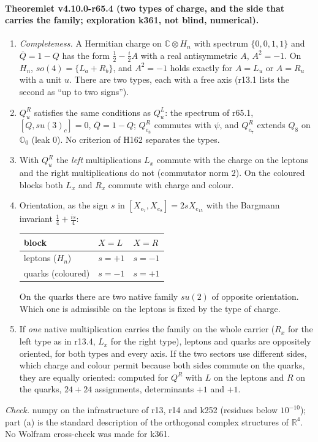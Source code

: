 \paragraph{Theoremlet v4.10.0-r65.4 (two types of charge, and the side that carries the family; exploration k361, not blind, numerical).}
\begin{enumerate}[leftmargin=2em]
\item[(a)] \emph{Completeness.}  A Hermitian charge on \(\mathbb C\otimes H_n\) with spectrum \(\{0,0,1,1\}\) and \(\overline Q=1-Q\) has the form
\(\tfrac12-\tfrac i2A\) with a real antisymmetric \(A\), \(A^2=-1\).  On \(H_n\), \(so(4)=\{L_a+R_b\}\), and \(A^2=-1\) holds exactly for
\(A=L_u\) or \(A=R_u\) with a unit \(u\).  There are two types, each with a free axis (r13.1 lists the second as ``up to two signs'').
\item[(b)] \(Q^R_u\) satisfies the same conditions as \(Q^L_u\): the spectrum of r65.1, \([Q,su(3)_c]=0\), \(\overline Q=1-Q\); \(Q^R_{e_8}\)
commutes with \(\psi\), and \(Q^R_{e_7}\) extends \(Q_8\) on \(\mathbb O_0\) (leak \(0\)).  No criterion of H162 separates the types.
\item[(c)] With \(Q^R_u\) the \emph{left} multiplications \(L_x\) commute with the charge on the leptons and the right multiplications do not
(commutator norm \(2\)).  On the coloured blocks both \(L_x\) and \(R_x\) commute with charge and colour.
\item[(d)] Orientation, as the sign \(s\) in \([X_{e_7},X_{e_8}]=2sX_{e_{15}}\) with the Bargmann invariant \(\tfrac14+\tfrac{is}4\):
\begin{center}
\small
\begin{tabular}{@{}lll@{}}
\toprule
block & \(X=L\) & \(X=R\)\\
\midrule
leptons (\(H_n\)) & \(s=+1\) & \(s=-1\)\\
quarks (coloured) & \(s=-1\) & \(s=+1\)\\
\bottomrule
\end{tabular}
\end{center}
On the quarks there are two native family \(su(2)\) of opposite orientation.  Which one is admissible on the leptons is fixed by the type of charge.
\item[(e)] If \emph{one} native multiplication carries the family on the whole carrier (\(R_x\) for the left type as in r13.4, \(L_x\) for the right
type), leptons and quarks are oppositely oriented, for both types and every axis.  If the two sectors use different sides, which charge and colour
permit because both sides commute on the quarks, they are equally oriented: computed for \(Q^R\) with \(L\) on the leptons and \(R\) on the
quarks, \(24+24\) assignments, determinants \(+1\) and \(+1\).
\end{enumerate}
\emph{Check.} numpy on the infrastructure of r13, r14 and k252 (residues below \(10^{-10}\)); part (a) is the standard description of the orthogonal
complex structures of \(\mathbb R^4\).  No Wolfram cross-check was made for k361.

